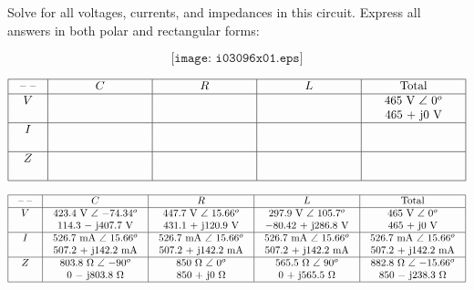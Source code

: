 

Solve for all voltages, currents, and impedances in this circuit.  Express all answers in both polar and rectangular forms:

$$\texttt{[image: i03096x01.eps]}$$


$$\vbox{\offinterlineskip
\halign{\strut
\vrule \quad\hfil # \ \hfil & 
\vrule \quad\hfil # \ \hfil & 
\vrule \quad\hfil # \ \hfil & 
\vrule \quad\hfil # \ \hfil & 
\vrule \quad\hfil # \ \hfil \vrule \cr
\noalign{\hrule}
%
 -- -- & $C$ & $R$ & $L$ & Total \cr
%
\noalign{\hrule}
%
$V$ & \hskip 75pt & \hskip 75pt & \hskip 75pt & 465 V $\angle$ 0$^{o}$ \cr
 &  &  &  & 465 + j0 V  \cr
%
\noalign{\hrule}
%
$I$ &  &  &  & \hskip 75pt \cr
 &  &  &  &   \cr
%
\noalign{\hrule}
%
$Z$ &  &  &  &   \cr
 &  &  &  &   \cr
%
\noalign{\hrule}
} %
}$$ %








$$\vbox{\offinterlineskip
\halign{\strut
\vrule \quad\hfil # \ \hfil & 
\vrule \quad\hfil # \ \hfil & 
\vrule \quad\hfil # \ \hfil & 
\vrule \quad\hfil # \ \hfil & 
\vrule \quad\hfil # \ \hfil \vrule \cr
\noalign{\hrule}
%
 -- -- & $C$ & $R$ & $L$ & Total \cr
%
\noalign{\hrule}
%
$V$ & 423.4 V $\angle$ $-74.34^o$ & 447.7 V $\angle$ 15.66$^{o}$ & 297.9 V $\angle$ 105.7$^{o}$ & 465 V $\angle$ 0$^{o}$ \cr
 & 114.3 $-$ j407.7 V & 431.1 + j120.9 V & $-80.42$ + j286.8 V & 465 + j0 V  \cr
%
\noalign{\hrule}
%
$I$ & 526.7 mA $\angle$ 15.66$^{o}$ & 526.7 mA $\angle$ 15.66$^{o}$ & 526.7 mA $\angle$ 15.66$^{o}$ & 526.7 mA $\angle$ 15.66$^{o}$ \cr
 & 507.2 + j142.2 mA & 507.2 + j142.2 mA & 507.2 + j142.2 mA & 507.2 + j142.2 mA \cr
%
\noalign{\hrule}
%
$Z$ & 803.8 $\Omega$ $\angle$ $-90^o$ & 850 $\Omega$ $\angle$ 0$^{o}$ & 565.5 $\Omega$ $\angle$ 90$^{o}$ & 882.8 $\Omega$ $\angle$ $-15.66^o$  \cr
 & 0 $-$ j803.8 $\Omega$ & 850 + j0 $\Omega$ & 0 + j565.5 $\Omega$ & 850 $-$ j238.3 $\Omega$ \cr
%
\noalign{\hrule}
} %
}$$ %











